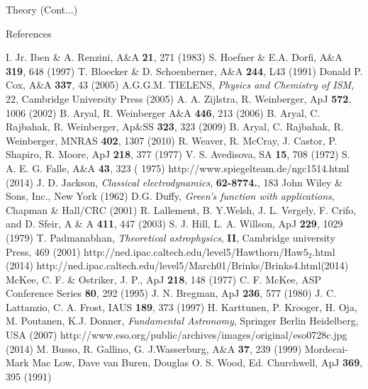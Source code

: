 \documentclass[12pt,a4paper]{beamer}
\begin{document}
\begin{frame}{Theory (Cont...)}
\begin{frame}{References}
\begin{itemize}
\begin{thebibliography}{1}
     I. Jr. Iben  \&  A. Renzini, A\&A \textbf{21}, 271 (1983)
     S. Hoefner \& E.A. Dorfi, A\&A \textbf{319}, 648 (1997)
    T. Bloecker \& D. Schoenberner,  A\&A \textbf{244}, L43 (1991)
    Donald P. Cox, A\&A \textbf{337}, 43 (2005)
     A.G.G.M. TIELENS,\emph{ Physics and Chemistry of ISM}, 22, Cambridge University Press (2005)
    A. A. Zijlstra,  R. Weinberger,  ApJ \textbf{572}, 1006 (2002)
   B. Aryal, R. Weinberger  A\&A \textbf{446}, 213 (2006)
   B. Aryal, C. Rajbahak,  R. Weinberger, Ap\&SS \textbf{323}, 323 (2009)
     B. Aryal, C. Rajbahak,  R. Weinberger,  MNRAS \textbf{402}, 1307 (2010)
    R. Weaver,  R. McCray,  J. Castor, P. Shapiro, R. Moore,   ApJ \textbf{218}, 377 (1977)
     V. S. Avedisova,  SA \textbf{15}, 708 (1972)
     S. A. E. G. Falle, A\&A \textbf{43}, 323 ( 1975)
    http://www.spiegelteam.de/ngc1514.html (2014)
    J. D. Jackson, \emph{Classical electrodynamics}, \textbf{62-8774.}, 183 John Wiley \& Sons, Inc., New York (1962)
    D.G. Duffy, \emph{Green's  function with applications},  Chapman \&
    Hall/CRC (2001)
R. Lallement, B. Y.Welsh, J. L. Vergely, F. Crifo, and D. Sfeir,  A \& A \textbf{411}, 447 (2003)
    S. J. Hill, L. A.  Willson,  ApJ \textbf{229}, 1029 (1979)
     T. Padmanabhan, \emph{Theoretical astrophysics}, \textbf{II}, Cambridge university Press, 469 (2001)
    http://ned.ipac.caltech.edu/level5/Hawthorn/Haw$5_2$.html (2014)
    http://ned.ipac.caltech.edu/level5/March01/Brinks/Brinks4.html(2014)
      McKee, C. F. \& Ostriker, J. P., ApJ \textbf{218}, 148 (1977)
       C. F. McKee, ASP Conference Series \textbf{ 80}, 292 (1995)
      J. N. Bregman, ApJ \textbf{236}, 577 (1980)
     J. C. Lattanzio,  C. A. Frost, IAUS \textbf{189},  373 (1997)
      H. Karttunen, P. Kr$\ddot{o}$oger, H. Oja, M. Poutanen, K.J. Donner, \emph {Fundamental Astronomy}, Springer Berlin Heidelberg, USA (2007)
     http://www.eso.org/public/archives/images/original/eso0728c.jpg (2014)
       M. Busso, R. Gallino, G. J.Wasserburg, A\&A \textbf{37}, 239 (1999)
      Mordecai-Mark Mac Low, Dave van Buren,  Douglas  O. S.  Wood,   Ed. Churchwell, ApJ \textbf{369}, 395 (1991)

\end{thebibliography}
\end{itemize}
\end{frame}
\end{frame}
\end{document}
